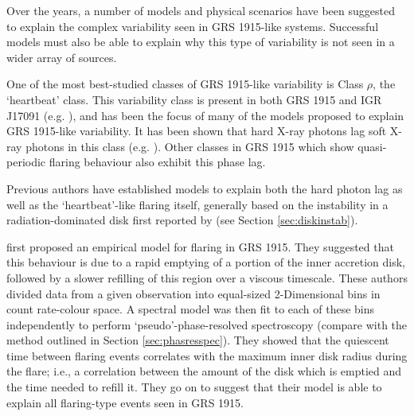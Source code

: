 \par Over the years, a number of models and physical scenarios have been suggested to explain the complex variability seen in GRS 1915-like systems.  Successful models must also be able to explain why this type of variability is not seen in a wider array of sources.
\par One of the most best-studied classes of GRS 1915-like variability is Class $\rho$, the `heartbeat' class.  This variability class is present in both GRS 1915 and IGR J17091 (e.g. \citealp{Altamirano_IGR_FH}), and has been the focus of many of the models proposed to explain GRS 1915-like variability.  It has been shown that hard X-ray photons lag soft X-ray photons in this class (e.g. \citealp{Janiuk_Lag,Massaro_Lag}).  Other classes in GRS 1915 which show quasi-periodic flaring behaviour also exhibit this phase lag.
\par Previous authors have established models to explain both the hard photon lag as well as the `heartbeat'-like flaring itself, generally based on the instability in a radiation-dominated disk first reported by \citealp{Shakura_Instab} (see Section \ref{sec:diskinstab}).
\par \citealp{Belloni_Model1} first proposed an empirical model for flaring in GRS 1915.  They suggested that this behaviour is due to a rapid emptying of a portion of the inner accretion disk, followed by a slower refilling of this region over a viscous timescale.  These authors divided data from a given observation into equal-sized 2-Dimensional bins in count rate-colour space.  A spectral model was then fit to each of these bins independently to perform `pseudo'-phase-resolved spectroscopy (compare with the method outlined in Section \ref{sec:phasresspec}).  They showed that the quiescent time between flaring events correlates with the maximum inner disk radius during the flare; i.e., a correlation between the amount of the disk which is emptied and the time needed to refill it.  They go on to suggest that their model is able to explain all flaring-type events seen in GRS 1915.
